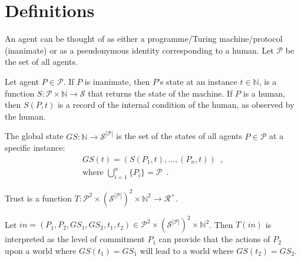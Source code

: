 \section{Definitions}
  \begin{definition}[Agent]
     An agent can be thought of as either a programme/Turing machine/protocol (inanimate) or as a pseudonymous identity
     corresponding to a human. Let $\mathcal{P}$ be the set of all agents.
  \end{definition}
  \begin{definition}[State]
    Let agent $P \in \mathcal{P}$. If $P$ is inanimate, then $P$'s state at an instance $t \in \mathbb{N}$, is a function $S :
    \mathcal{P} \times \mathbb{N} \rightarrow \mathcal{S}$ that returns the state of the machine. If $P$ is a human, then
    $S\left(P, t\right)$ is a record of the internal condition of the human, as observed by the human.
  \end{definition}
  \begin{definition}
    The global state $GS : \mathbb{N} \rightarrow \mathcal{S}^{|\mathcal{P}|}$ is the set of the states of all agents $P \in
    \mathcal{P}$ at a specific instance: 
    \begin{gather*}
      GS\left(t\right) = \left(S\left(P_1, t\right), ...,\left(P_n, t\right)\right) \enspace, \\
      \mbox{where } \bigcup\limits_{i = 1}^n\{P_i\} = \mathcal{P} \enspace.
    \end{gather*}
  \end{definition}
  \begin{definition}[Trust]
    Trust is a function $T : \mathcal{P}^2 \times \left(\mathcal{S}^{|\mathcal{P}|}\right)^2 \times \mathbb{N}^2 \rightarrow
    \mathcal{R}^{+}$.
  \end{definition}
  Let $in = \left(P_1, P_2, GS_1, GS_2, t_1, t_2\right) \in \mathcal{P}^2 \times \left(\mathcal{S}^{|\mathcal{P}|}\right)^2
  \times \mathbb{N}^2$. Then $T\left(in\right)$ is interpreted as the level of commitment $P_1$ can provide that the actions
  of $P_2$ upon a world where $GS\left(t_1\right) = GS_1$ will lead to a world where $GS\left(t_2\right) = GS_2$.

